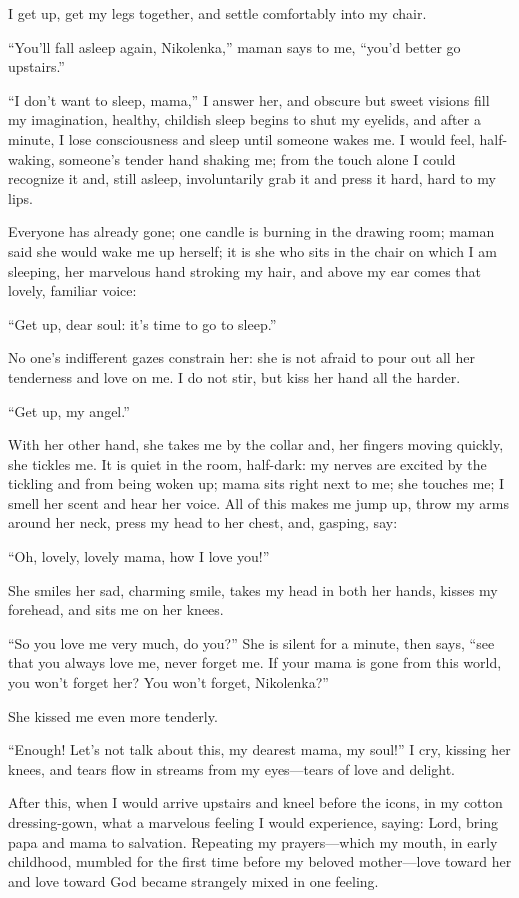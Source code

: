I get up, get my legs together, and settle comfortably into my chair.

``You'll fall asleep again, Nikolenka,'' maman says to me, ``you'd better go upstairs.'' %

``I don't want to sleep, mama,'' I answer her, and obscure but sweet visions fill my imagination, healthy, childish sleep begins to shut my eyelids, and after a minute, I lose consciousness and sleep until someone wakes me. I would feel, half-waking, someone's tender hand shaking me; from the touch alone I could recognize it and, still asleep, involuntarily grab it and press it hard, hard to my lips. %

Everyone has already gone; one candle is burning in the drawing room; maman said she would wake me up herself; it is she who sits in the chair on which I am sleeping, her marvelous hand stroking my hair, and above my ear comes that lovely, familiar voice:

``Get up, dear soul: it's time to go to sleep.'' %

No one's indifferent gazes constrain her: she is not afraid to pour out all her tenderness and love on me. I do not stir, but kiss her hand all the harder.

``Get up, my angel.'' %

With her other hand, she takes me by the collar and, her fingers moving quickly, she tickles me. It is quiet in the room, half-dark: my nerves are excited by the tickling and from being woken up; mama sits right next to me; she touches me; I smell her scent and hear her voice. All of this makes me jump up, throw my arms around her neck, press my head to her chest, and, gasping, say:

``Oh, lovely, lovely mama, how I love you!'' %

She smiles her sad, charming smile, takes my head in both her hands, kisses my forehead, and sits me on her knees.

``So you love me very much, do you?'' She is silent for a minute, then says, ``see that you always love me, never forget me. If your mama is gone from this world, you won't forget her? You won't forget, Nikolenka?'' %

She kissed me even more tenderly.

``Enough! Let's not talk about this, my dearest mama, my soul!'' I cry, kissing her knees, and tears flow in streams from my eyes---tears of love and delight. %

After this, when I would arrive upstairs and kneel before the icons, in my cotton dressing-gown, what a marvelous feeling I would experience, saying: Lord, bring papa and mama to salvation. Repeating my prayers---which my mouth, in early childhood, mumbled for the first time before my beloved mother---love toward her and love toward God became strangely mixed in one feeling.

